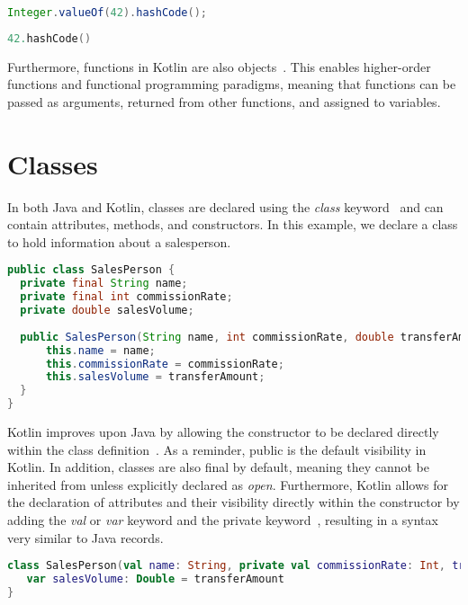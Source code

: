 \documentclass[a4paper, 11pt]{article}
\begin{document}
\begin{lstlisting}[language=Java,title={Java Integer Wrapper}]
Integer.valueOf(42).hashCode();
\end{lstlisting}

\begin{lstlisting}[language=Kotlin,title={Kotlin direct usage of Int}]
42.hashCode()
\end{lstlisting}

Furthermore, functions in Kotlin are also objects~\cite{higher-order-functions}. This enables higher-order functions and functional programming paradigms, meaning that functions can be passed as arguments, returned from other functions, and assigned to variables.

\section{Classes}
In both Java and Kotlin, classes are declared using the \textit{class} keyword~\cite{classes} and can contain attributes, methods, and constructors. In this example, we declare a class to hold information about a salesperson.

\begin{lstlisting}[language=Java,title={Java Class Declaration}]
public class SalesPerson {
  private final String name;
  private final int commissionRate;
  private double salesVolume;
  
  public SalesPerson(String name, int commissionRate, double transferAmount) {
      this.name = name;
      this.commissionRate = commissionRate;
      this.salesVolume = transferAmount;
  }
}
\end{lstlisting}

Kotlin improves upon Java by allowing the constructor to be declared directly within the class definition~\cite{classes-constructors}. As a reminder, public is the default visibility in Kotlin. In addition, classes are also final by default, meaning they cannot be inherited from unless explicitly declared as \textit{open}.
Furthermore, Kotlin allows for the declaration of attributes and their visibility directly within the constructor by adding the \textit{val} or \textit{var} keyword and the private keyword~\cite{classes-constructors}, resulting in a syntax very similar to Java records.

\begin{lstlisting}[language=Kotlin,title={Kotlin Class Declaration}]
class SalesPerson(val name: String, private val commissionRate: Int, transferAmount: Double = 0.0) {
   var salesVolume: Double = transferAmount
}
\end{lstlisting}
\end{document}
